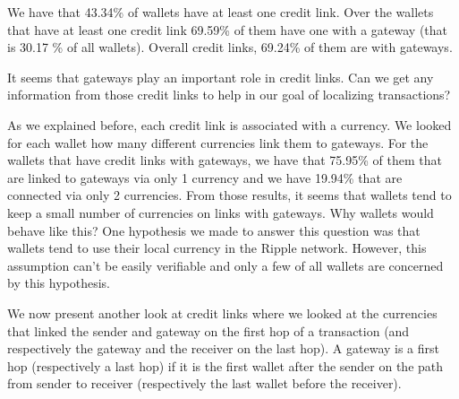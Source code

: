 We have that 43.34\% of wallets have at least one credit link. Over the wallets that have at least one credit link 69.59\% of them have one with a gateway (that is 30.17 \% of all wallets). Overall credit links, 69.24\% of them are with gateways.

It seems that gateways play an important role in credit links. Can we get any information from those credit links to help in our goal of localizing transactions?

As we explained before, each credit link is associated with a currency. We looked for each wallet how many different currencies link them to gateways. For the wallets that have credit links with gateways, we have that 75.95\% of them that are linked to gateways via only 1 currency and we have 19.94\% that are connected via only 2 currencies. From those results, it seems that wallets tend to keep a small number of currencies on links with gateways. Why wallets would behave like this? One hypothesis we made to answer this question was that wallets tend to use their local currency in the Ripple network. However, this assumption can't be easily verifiable and only a few of all wallets are concerned by this hypothesis.

We now present another look at credit links where we looked at the currencies that linked the sender and gateway on the first hop of a transaction (and respectively the gateway and the receiver on the last hop). A gateway is a first hop (respectively a last hop) if it is the first wallet after the sender on the path from sender to receiver (respectively the last wallet before the receiver).

